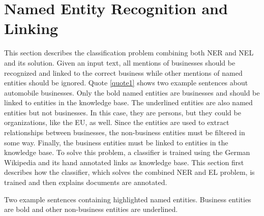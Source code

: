 \section{Named Entity Recognition and Linking}
\label{sec:NEL}
This section describes the classification problem combining both NER and NEL and its solution. Given an input text, all mentions of businesses should be recognized and linked to the correct business while other mentions of named entities should be ignored. Quote \ref{quote1} shows two example sentences about automobile businesses. Only the bold named entities are businesses and should be linked to entities in the knowledge base. The underlined entities are also named entities but not businesses. In this case, they are persons, but they could be organizations, like the EU, as well. Since the entities are used to extract relationships between businesses, the non-business entities must be filtered in some way. Finally, the business entities must be linked to entities in the knowledge base. To solve this problem, a classifier is trained using the German Wikipedia and its hand annotated links as knowledge base. This section first describes how the classifier, which solves the combined NER and EL problem, is trained and then explains documents are annotated.\\
\begin{nscenter}
    \begin{quotecaption}
    Two example sentences containing highlighted named entities. Business entities are bold and other non-business entities are underlined.
    \label{quote1}
    \end{quotecaption}
\end{nscenter}

